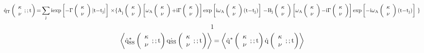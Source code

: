 \documentclass{article}
\begin{document}
\[{\dot{{\rm q}}}_{{\rm T}}\left( \begin{array}{c}
{\mathbf \kappa } \\ 
\nu  \end{array}
;;{\rm t}\right){\rm =}\sum_{{\rm j}}{{\rm i}{\exp  \left[{\rm -}\Gamma \left( \begin{array}{c}
{\mathbf \kappa } \\ 
\nu  \end{array}
\right)\left|{\rm t-}{{\rm t}}_{{\rm j}}\right|\right]\ }{\rm \times }{\{{\rm A}}_{{\rm j}}\left( \begin{array}{c}
{\mathbf \kappa } \\ 
\nu  \end{array}
\right)\left[{\omega }_{{\rm A}}\left( \begin{array}{c}
{\mathbf \kappa } \\ 
\nu  \end{array}
\right){\rm +i}\Gamma \left( \begin{array}{c}
{\mathbf \kappa } \\ 
\nu  \end{array}
\right)\right]{\exp  \left[{\rm i}{\omega }_{{\rm A}}\left( \begin{array}{c}
{\mathbf \kappa } \\ 
\nu  \end{array}
\right)\left({\rm t-}{{\rm t}}_{{\rm j}}\right)\right]\ }{\rm -}{{\rm B}}_{{\rm j}}\left( \begin{array}{c}
{\mathbf \kappa } \\ 
\nu  \end{array}
\right){\left[{\omega }_{{\rm A}}\left( \begin{array}{c}
{\mathbf \kappa } \\ 
\nu  \end{array}
\right){\rm -}{\rm i}\Gamma \left( \begin{array}{c}
{\mathbf \kappa } \\ 
\nu  \end{array}
\right)\right]\exp  \left[{\rm -}{\rm i}{\omega }_{{\rm A}}\left( \begin{array}{c}
{\mathbf \kappa } \\ 
\nu  \end{array}
\right)\left({\rm t-}{{\rm t}}_{{\rm j}}\right)\right]\ }\}}\] 
\[1\] 
\[\left\langle {\dot{{\rm q}}}^{{\rm *}}_{{\rm SS}}\left( \begin{array}{c}
{\mathbf \kappa } \\ 
\nu  \end{array}
;;{\rm t}\right)\dot{{{\rm q}}_{{\rm SS}}}\left( \begin{array}{c}
{\mathbf \kappa } \\ 
\nu  \end{array}
;;{\rm t}\right)\right\rangle =\left\langle {\dot{{\rm q}}}^{{\rm *}}\left( \begin{array}{c}
{\mathbf \kappa } \\ 
\nu  \end{array}
;;{\rm t}\right)\dot{{\rm q}}\left( \begin{array}{c}
{\mathbf \kappa } \\ 
\nu  \end{array}
;;{\rm t}\right)\right\rangle \] 
\end{document}
